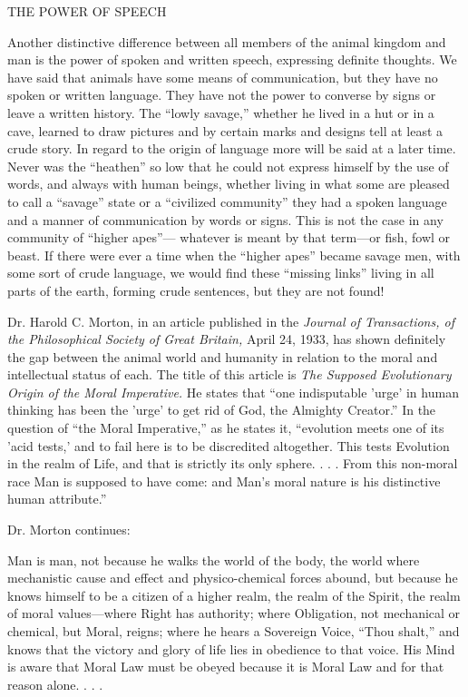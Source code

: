 THE POWER OF SPEECH

Another distinctive difference between all members of the animal kingdom and man is the
power of spoken and written speech, expressing definite thoughts. We have said that animals
have some means of communication, but they have no spoken or written language. They
have not the power to converse by signs or leave a written history. The ``lowly savage,''
whether he lived in a hut or in a cave, learned to draw pictures and by certain marks and
designs tell at least a crude story. In regard to the origin of language more will be said at a
later time. Never was the ``heathen'' so low that he could not express himself by the use of
words, and always with human beings, whether living in what some are pleased to call a
``savage'' state or a ``civilized community'' they had a spoken language and a manner of
communication by words or signs. This is not the case in any community of ``higher apes''—
whatever is meant by that term—or fish, fowl or beast. If there were ever a time when the
``higher apes'' became savage men, with some sort of crude language, we would find these
``missing links'' living in all parts of the earth, forming crude sentences, but they are not
found!

Dr. Harold C. Morton, in an article published in the \textit{Journal of Transactions, of the
Philosophical Society of Great Britain,} April 24, 1933, has shown definitely the gap between
the animal world and humanity in relation to the moral and intellectual status of each. The
title of this article is \textit{The Supposed Evolutionary Origin of the Moral Imperative.} He states
that ``one indisputable 'urge' in human thinking has been the 'urge' to get rid of God, the
Almighty Creator.'' In the question of ``the Moral Imperative,'' as he states it, ``evolution
meets one of its 'acid tests,' and to fail here is to be discredited altogether. This tests
Evolution in the realm of Life, and that is strictly its only sphere. . . . From this non-moral
race Man is supposed to have come: and Man's moral nature is his distinctive human
attribute.''

Dr. Morton continues:

Man is man, not because he walks the world of the body, the world where mechanistic cause
and effect and physico-chemical forces abound, but because he knows himself to be a citizen
of a higher realm, the realm of the Spirit, the realm of moral values—where Right has
authority; where Obligation, not mechanical or chemical, but Moral, reigns; where he hears a
Sovereign Voice, ``Thou shalt,'' and knows that the victory and glory of life lies in obedience
to that voice. His Mind is aware that Moral Law must be obeyed because it is Moral Law and
for that reason alone. . . .

